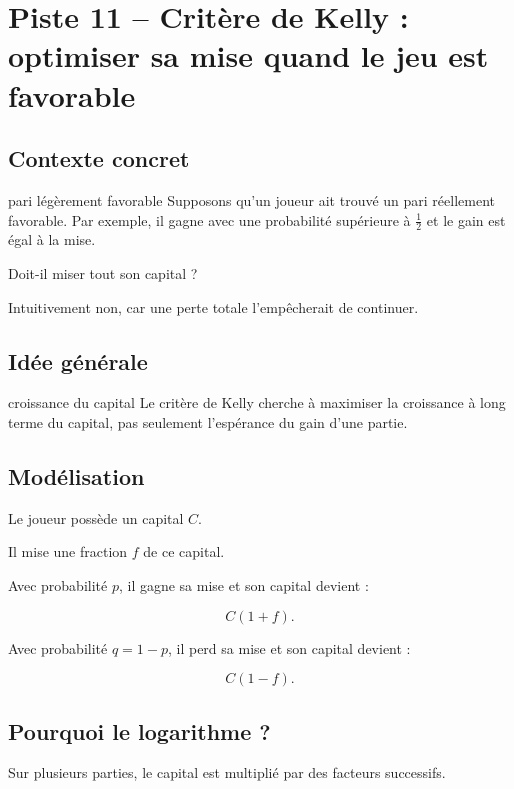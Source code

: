 \documentclass[11pt,a4paper]{article}
\begin{document}
\section{Piste 11 -- Critère de Kelly : optimiser sa mise quand le jeu est favorable}

\subsection{Contexte concret}

\begin{contexte}{pari légèrement favorable}
Supposons qu'un joueur ait trouvé un pari réellement favorable. Par exemple, il gagne avec une probabilité supérieure à $\frac12$ et le gain est égal à la mise.

Doit-il miser tout son capital ?

Intuitivement non, car une perte totale l'empêcherait de continuer.
\end{contexte}

\subsection{Idée générale}

\begin{idee}{croissance du capital}
Le critère de Kelly cherche à maximiser la croissance à long terme du capital, pas seulement l'espérance du gain d'une partie.
\end{idee}

\subsection{Modélisation}

Le joueur possède un capital $C$.

Il mise une fraction $f$ de ce capital.

Avec probabilité $p$, il gagne sa mise et son capital devient :

\[
C(1+f).
\]

Avec probabilité $q=1-p$, il perd sa mise et son capital devient :

\[
C(1-f).
\]

\subsection{Pourquoi le logarithme ?}

Sur plusieurs parties, le capital est multiplié par des facteurs successifs.
\end{document}
